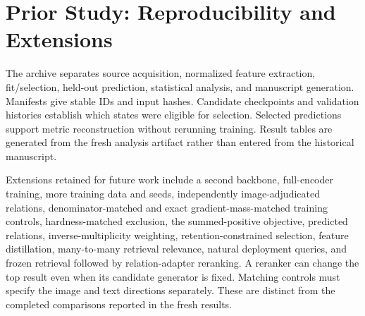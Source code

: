 \section{Prior Study: Reproducibility and Extensions}
The archive separates source acquisition, normalized feature extraction, fit/selection, held-out prediction, statistical analysis, and manuscript generation. Manifests give stable IDs and input hashes. Candidate checkpoints and validation histories establish which states were eligible for selection. Selected predictions support metric reconstruction without rerunning training. Result tables are generated from the fresh analysis artifact rather than entered from the historical manuscript.

Extensions retained for future work include a second backbone, full-encoder training, more training data and seeds, independently image-adjudicated relations, denominator-matched and exact gradient-mass-matched training controls, hardness-matched exclusion, the summed-positive objective, predicted relations, inverse-multiplicity weighting, retention-constrained selection, feature distillation, many-to-many retrieval relevance, natural deployment queries, and frozen retrieval followed by relation-adapter reranking. A reranker can change the top result even when its candidate generator is fixed. Matching controls must specify the image and text directions separately. These are distinct from the completed comparisons reported in the fresh results.
